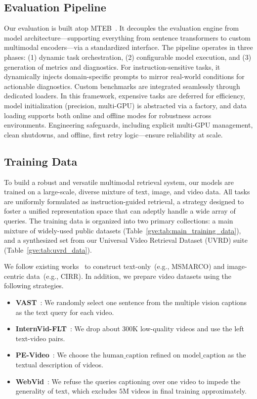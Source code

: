 \subsection{Evaluation Pipeline}\label{gve:app:evaluation_pipeline}
Our evaluation is built atop MTEB~\cite{muennighoff2022mteb}. It decouples the evaluation engine from model architecture—supporting everything from sentence transformers to custom multimodal encoders—via a standardized interface. The pipeline operates in three phases: (1) dynamic task orchestration, (2) configurable model execution, and (3) generation of metrics and diagnostics.
For instruction-sensitive tasks, it dynamically injects domain-specific prompts to mirror real-world conditions for actionable diagnostics.
Custom benchmarks are integrated seamlessly through dedicated loaders.
In this framework, expensive tasks are deferred for efficiency, model initialization (precision, multi-GPU) is abstracted via a factory, and data loading supports both online and offline modes for robustness across environments.
Engineering safeguards, including explicit multi-GPU management, clean shutdowns, and offline, first retry logic—ensure reliability at scale.




\subsection{Training Data}\label{gve:app:training_data}

To build a robust and versatile multimodal retrieval system, our models are trained on a large-scale, diverse mixture of text, image, and video data. All tasks are uniformly formulated as instruction-guided retrieval, a strategy designed to foster a unified representation space that can adeptly handle a wide array of queries. The training data is organized into two primary collections: a main mixture of widely-used public datasets (Table~\ref{gve:tab:main_training_data}), and a synthesized set from our Universal Video Retrieval Dataset (UVRD) suite (Table~\ref{gve:tab:uvrd_data}).

We follow existing works~\cite{li2023towards,Zhang_2025_CVPR} to construct text-only~(e.g., MSMARCO) and image-centric data~(e.g., CIRR).
In addition, we prepare video datasets using the following strategies.
\begin{itemize}
    \item \textbf{VAST}~\cite{chen2023vast}: We randomly select one sentence from the multiple vision captions as the text query for each video.
    \item \textbf{InternVid-FLT}~\cite{wang2023internvid}: We drop about $300$K low-quality videos and use the left text-video pairs.
    \item \textbf{PE-Video}~\cite{bolya2025perception}: We choose the $\text{human\_caption}$ refined on $\text{model\_caption}$ as the textual description of videos.
    \item \textbf{WebVid}~\cite{bain2021frozen}: We refuse the queries captioning over one video to impede the generality of text, which excludes $5$M videos in final training approximately.
\end{itemize}

